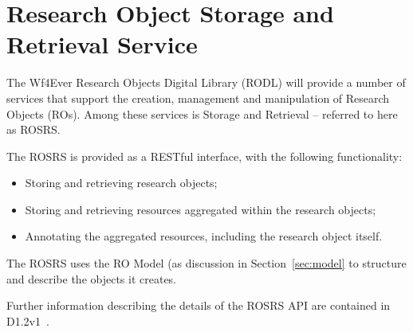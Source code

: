 \section{Research Object Storage and Retrieval Service}
\label{sec:rosrs}

The Wf4Ever Research Objects Digital Library (RODL) will provide a number of services that support the creation, management and manipulation of Research Objects (ROs). Among these services is Storage and Retrieval -- referred to here as ROSRS. 

The ROSRS is provided as a RESTful interface, with the following functionality:

\begin{itemize}
\item Storing and retrieving research objects;
\item Storing and retrieving resources aggregated within the research objects;
\item Annotating the aggregated resources, including the research object itself. 
\end{itemize}

The ROSRS uses the RO Model (as discussion in Section~\ref{sec:model} to structure and describe the objects it creates. 

Further information describing the details of the ROSRS API are contained in D1.2v1~\cite{D1.4v1}.



